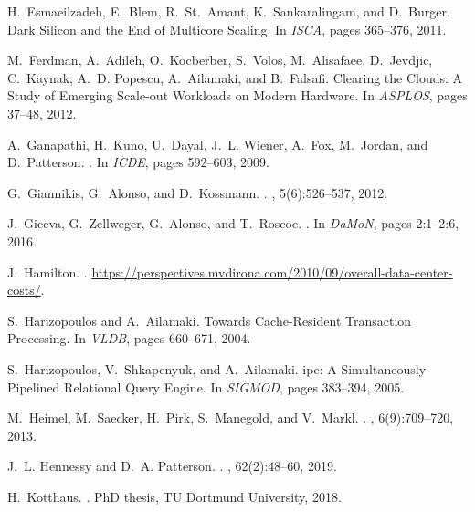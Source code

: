 \documentclass[11pt]{article}
\begin{document}
\begin{thebibliography}{10}
\begin{small}
H.~Esmaeilzadeh, E.~Blem, R.~St.~Amant, K.~Sankaralingam, and D.~Burger.
\newblock Dark {S}ilicon and the {E}nd of {M}ulticore {S}caling.
\newblock In {\em ISCA}, pages 365--376, 2011.

M.~Ferdman, A.~Adileh, O.~Kocberber, S.~Volos, M.~Alisafaee, D.~Jevdjic,
  C.~Kaynak, A.~D. Popescu, A.~Ailamaki, and B.~Falsafi.
\newblock Clearing the {C}louds: {A} {S}tudy of {E}merging {S}cale-out
  {W}orkloads on {M}odern {H}ardware.
\newblock In {\em ASPLOS}, pages 37--48, 2012.

A.~{Ganapathi}, H.~{Kuno}, U.~{Dayal}, J.~L. {Wiener}, A.~{Fox}, M.~{Jordan},
  and D.~{Patterson}.
.
\newblock In {\em ICDE}, pages 592--603, 2009.

G.~Giannikis, G.~Alonso, and D.~Kossmann.
.
, 5(6):526--537, 2012.

J.~Giceva, G.~Zellweger, G.~Alonso, and T.~Roscoe.
.
\newblock In {\em DaMoN}, pages 2:1--2:6, 2016.

J.~Hamilton.
.
\newblock
  \url{https://perspectives.mvdirona.com/2010/09/overall-data-center-costs/}.

S.~Harizopoulos and A.~Ailamaki.
 {T}owards {C}ache-{R}esident {T}ransaction {P}rocessing.
\newblock In {\em VLDB}, pages 660--671, 2004.

S.~Harizopoulos, V.~Shkapenyuk, and A.~Ailamaki.
ipe: {A} {S}imultaneously {P}ipelined {R}elational {Q}uery
  {E}ngine.
\newblock In {\em SIGMOD}, pages 383--394, 2005.

M.~Heimel, M.~Saecker, H.~Pirk, S.~Manegold, and V.~Markl.
.
, 6(9):709--720, 2013.

J.~L. Hennessy and D.~A. Patterson.
.
, 62(2):48--60, 2019.

H.~Kotthaus.
.
\newblock PhD thesis, TU Dortmund University, 2018.


\end{small}
\end{thebibliography}
\end{document}
